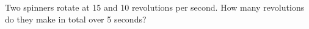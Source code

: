 Two spinners rotate at 15 and 10 revolutions per second. How many revolutions do they make in total over 5 seconds?

